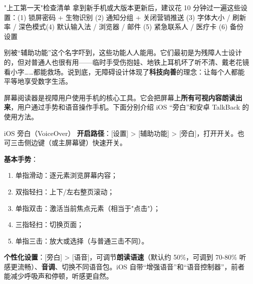 \begin{tcbinfo}{"上工第一天"检查清单}
拿到新手机或大版本更新后，建议花 10 分钟过一遍这些设置：\newline (1) 锁屏密码 + 生物识别 (2) 通知分组 + 关闭营销推送 (3) 字体大小 / 刷新率 / 深色模式\newline (4) 默认输入法 / 浏览器 / 邮件 (5) 紧急联系人 / 医疗卡 (6) 备份设置

\end{tcbinfo}


别被“辅助功能”这个名字吓到，这些功能人人能用。它们最初是为残障人士设计的，但对普通人也很有用——临时手受伤抱娃、地铁上耳机坏了听不清、戴老花镜看小字……都能救场。说到底，无障碍设计体现了\textbf{科技向善}的理念：让每个人都能平等地享受数字生活。


屏幕阅读器是视障用户使用手机的核心工具。它会把屏幕上\textbf{所有可视内容朗读出来}，用户通过手势和语音操作手机。下面分别介绍 iOS “旁白”和安卓 TalkBack 的使用方法。

\begin{tcbinfo}{iOS 旁白（VoiceOver）}
\textbf{开启路径}：[设置] > [辅助功能] > [旁白]，打开开关。也可三击侧边键（或主屏幕键）快速开关。

\textbf{基本手势}：

\begin{enumerate}
  \item 单指滑动：逐元素浏览屏幕内容；
  \item 双指轻扫：上下/左右整页滚动；
  \item 单指双击：激活当前焦点元素（相当于"点击"）；
  \item 三指轻扫：切换页面；
  \item 单指三击：放大或选择（与普通三击不同）。
\end{enumerate}

\textbf{个性化设置}：[旁白] > [语音]，可调节\textbf{朗读语速}（默认约 50\%，可调到 70-80\% 听感更流畅）、\textbf{音调}、切换不同语音包。iOS 自带“增强语音”和“语音控制器”，前者能减少呼吸声和停顿，听感更自然。

\end{tcbinfo}


